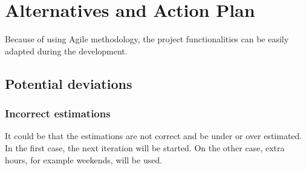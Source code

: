 
\chapter{Alternatives and Action Plan} %

\label{Chapter4} %

Because of using Agile methodology, the project functionalities can be easily adapted during the development. 

\section{Potential deviations}
\subsection{Incorrect estimations}
It could be that the estimations are not correct and be under or over estimated. In the first case, the next iteration will be started. On the other case, extra hours, for example weekends, will be used.






